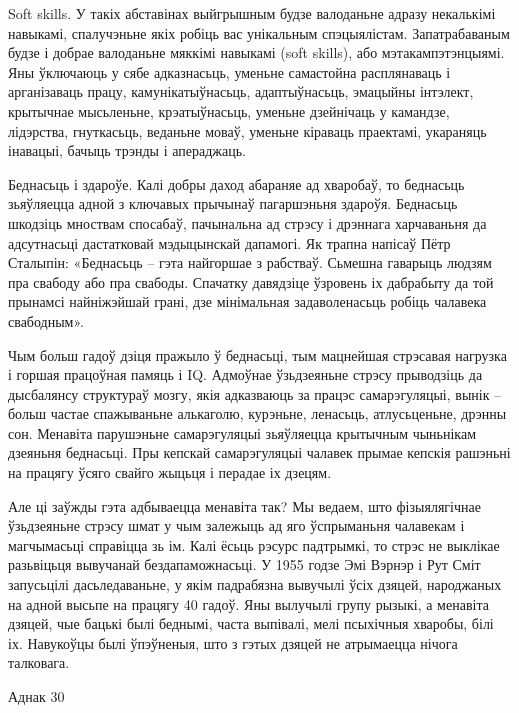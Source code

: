 Soft skills. У такіх абставінах выйгрышным будзе валоданьне адразу некалькімі навыкамі, спалучэньне якіх робіць вас унікальным спэцыялістам. Запатрабаваным будзе і добрае валоданьне мяккімі навыкамі (soft skills), або мэтакампэтэнцыямі. Яны ўключаюць у сябе адказнасьць, уменьне самастойна расплянаваць і арганізаваць працу, камунікатыўнасьць, адаптыўнасьць, эмацыйны інтэлект, крытычнае мысьленьне, крэатыўнасьць, уменьне дзейнічаць у камандзе, лідэрства, гнуткасьць, веданьне моваў, уменьне кіраваць праектамі, укараняць інавацыі, бачыць трэнды і апераджаць.

Беднасьць і здароўе. Калі добры даход абараняе ад хваробаў, то беднасьць зьяўляецца адной з ключавых прычынаў пагаршэньня здароўя. Беднасьць шкодзіць мноствам спосабаў, пачынальна ад стрэсу і дрэннага харчаваньня да адсутнасьці дастатковай мэдыцынскай дапамогі. Як трапна напісаў Пётр Сталыпін: «Беднасьць – гэта найгоршае з рабстваў. Сьмешна гаварыць людзям пра свабоду або пра свабоды. Спачатку давядзіце ўзровень іх дабрабыту да той прынамсі найніжэйшай грані, дзе мінімальная задаволенасьць робіць чалавека свабодным».

Чым больш гадоў дзіця пражыло ў беднасьці, тым мацнейшая стрэсавая нагрузка і горшая працоўная памяць і IQ. Адмоўнае ўзьдзеяньне стрэсу прыводзіць да дысбалянсу структураў мозгу, якія адказваюць за працэс самарэгуляцыі, вынік – больш частае спажываньне алькаголю, курэньне, ленасьць, атлусьценьне, дрэнны сон. Менавіта парушэньне самарэгуляцыі зьяўляецца крытычным чыньнікам дзеяньня беднасьці. Пры кепскай самарэгуляцыі чалавек прымае кепскія рашэньні на працягу ўсяго свайго жыцьця і перадае іх дзецям.

Але ці заўжды гэта адбываецца менавіта так? Мы ведаем, што фізыялягічнае ўзьдзеяньне стрэсу шмат у чым залежыць ад яго ўспрыманьня чалавекам і магчымасьці справіцца зь ім. Калі ёсьць рэсурс падтрымкі, то стрэс не выклікае разьвіцьця вывучанай бездапаможнасьці. У 1955 годзе Эмі Вэрнэр і Рут Сміт запусьцілі дасьледаваньне, у якім падрабязна вывучылі ўсіх дзяцей, народжаных на адной высьпе на працягу 40 гадоў. Яны вылучылі групу рызыкі, а менавіта дзяцей, чые бацькі былі беднымі, часта выпівалі, мелі псыхічныя хваробы, білі іх. Навукоўцы былі ўпэўненыя, што з гэтых дзяцей не атрымаецца нічога талковага.

Аднак 30%

